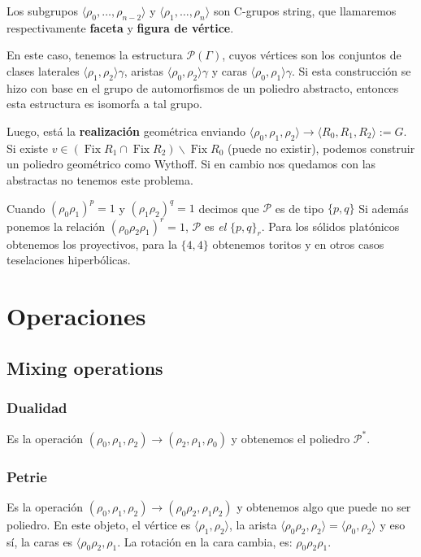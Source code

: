 \documentclass[spanish]{article}
\theoremstyle{definition}
\newcommand{\p}{\mathcal{P}}
\DeclareMathOperator{\Fix}{Fix}
\begin{document}
Los subgrupos $\langle\rho_0,\ldots,\rho_{n-2}\rangle$ y $\langle\rho_1,\ldots,\rho_n\rangle$ son C-grupos string, que llamaremos respectivamente \textbf{faceta} y \textbf{figura de vértice}.



En este caso, tenemos la estructura $\p(\Gamma)$, cuyos vértices son los conjuntos de clases laterales $\langle\rho_1,\rho_2\rangle\gamma$, aristas $\langle\rho_0,\rho_2\rangle\gamma$ y caras $\langle\rho_0,\rho_1\rangle\gamma$. Si esta construcción se hizo con base en el grupo de automorfismos de un poliedro abstracto, entonces esta estructura es isomorfa a tal grupo.

Luego, está la \textbf{realización} geométrica enviando $\langle\rho_0,\rho_1,\rho_2\rangle\to\langle R_0,R_1,R_2\rangle:=G$. Si existe $v\in(\Fix R_1\cap\Fix R_2)\backslash\Fix R_0$ (puede no existir), podemos construir un poliedro geométrico como Wythoff. Si en cambio nos quedamos con las abstractas no tenemos este problema.

Cuando $(\rho_0\rho_1)^p=1$ y $(\rho_1\rho_2)^q=1$ decimos que $\p$ es de tipo $\{p,q\}$ Si además ponemos la relación $(\rho_0\rho_2\rho_1)^r=1$, $\p$ es \textit{el} $\{p,q\}_r$. Para los sólidos platónicos obtenemos los proyectivos, para la $\{4,4\}$ obtenemos toritos y en otros casos teselaciones hiperbólicas.
\section{Operaciones}
\subsection{Mixing operations}
\subsubsection{Dualidad}
Es la operación $(\rho_0,\rho_1,\rho_2)\to(\rho_2,\rho_1,\rho_0)$ y obtenemos el poliedro $\p^*$.
\subsubsection{Petrie}
Es la operación $(\rho_0,\rho_1,\rho_2)\to(\rho_0\rho_2,\rho_1\rho_2)$ y obtenemos algo que puede no ser poliedro. En este objeto, el vértice es $\langle\rho_1,\rho_2\rangle$, la arista $\langle\rho_0\rho_2,\rho_2\rangle=\langle\rho_0,\rho_2\rangle$ y eso sí, la caras es $\langle\rho_0\rho_2,\rho_1$. La rotación en la cara cambia, es: $\rho_0\rho_2\rho_1$.
\end{document}
